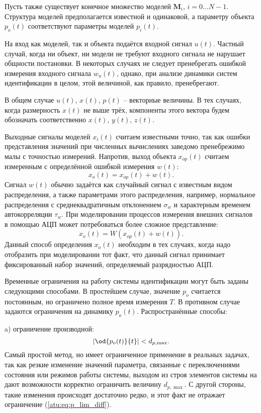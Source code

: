 Пусть также существует конечное множество моделей
\label{atu:d:N}$\mathbf{M}_i$, $i=0 \ldots N-1$.
Структура моделей предполагается известной и одинаковой,
а параметру объекта $p_o(t)$ соответствуют параметры моделей $p_{i}(t)$.

На вход как моделей, так и объекта подаётся входной сигнал \label{atu:d:u}$u(t)$.
Частный случай, когда ни объект, ни модели не требуют входного сигнала
не нарушает общности постановки. В некоторых случаях
не следует пренебрегать ошибкой измерения входного сигнала $w_u(t)$,
однако, при анализе динамики систем идентификации в целом,
этой величиной, как правило, пренебрегают.

В общем случае $u(t)$, $x(t)$, $p(t)$ -- векторные величины.
В тех случаях, когда размерность $x(t)$ не выше трёх,
компоненты этого вектора будем обозначать соответственно $x(t)$, $y(t)$, $z(t)$.

Выходные сигналы моделей
\label{atu:d:x}$x_i(t)$ считаем известными точно, так как ошибки
представления значений при численных вычислениях заведомо
пренебрежимо малы с точностью измерений. Напротив,
выход объекта $x_{op}(t)$ считаем измеренным
с определённой ошибкой измерения \label{atu:d:w}$w(t)$:
%
\[
  x_o(t) = x_{op}(t) + w(t).
\]
%
Сигнал $w(t)$ обычно задаётся как случайный сигнал с
известным видом распределения, а также параметрами этого распределения,
например, нормальное распределения с среднеквадратичным отклонением $\sigma_w$
и характерным временем автокорреляции $\tau_w$.
При моделировании процессов измерения внешних сигналов в помощью АЦП может потребоваться
более сложное представление:
%
\[
  x_o(t) = W( x_{op}(t) + w(t) ).
\]
%
Данный способ определения $x_o(t)$ необходим в тех случаях,
когда надо отобразить при моделировании тот факт,
что данный сигнал принимает фиксированный набор значений, определяемый разрядностью АЦП.

Временные ограничения на работу системы идентификации могут быть заданы
следующими способами. В простейшем случае, значение $p_o$
считается постоянным, но ограничено полное время измерения $T$.
В противном случае задаются ограничения на динамику $p_o(t)$.
Распространённые способы:

a) ограничение производной:
%
\begin{equation}
  \left| \od{p_o(t)}{t} \right| < d_{p,\max}.
  \label{atu:eq:p_lim_diff}
\end{equation}
Самый простой метод, но имеет ограниченное применение в реальных
задачах, так как резкие изменение значений параметра,
связанные с переключениями состояния или режимов работы системы,
выходом из строя элементов системы на дают возможности корректно ограничить
величину  $d_{p,\max}$. С другой стороны, такие изменения
происходят достаточно редко, и этот факт не отражает ограничение (\ref{atu:eq:p_lim_diff}).

